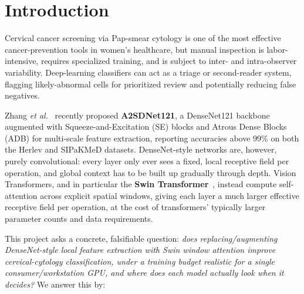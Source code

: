 \documentclass[10pt,twocolumn]{article}
\begin{document}
\section{Introduction}

Cervical cancer screening via Pap-smear cytology is one of the most effective cancer-prevention tools in women's healthcare, but manual inspection is labor-intensive, requires specialized training, and is subject to inter- and intra-observer variability. Deep-learning classifiers can act as a triage or second-reader system, flagging likely-abnormal cells for prioritized review and potentially reducing false negatives.

Zhang \emph{et al.}~\cite{zhang2025} recently proposed \textbf{A2SDNet121}, a DenseNet121 backbone augmented with Squeeze-and-Excitation (SE) blocks and Atrous Dense Blocks (ADB) for multi-scale feature extraction, reporting accuracies above 99\% on both the Herlev and SIPaKMeD datasets. DenseNet-style networks are, however, purely convolutional: every layer only ever sees a fixed, local receptive field per operation, and global context has to be built up gradually through depth. Vision Transformers, and in particular the \textbf{Swin Transformer}~\cite{liu2021swin}, instead compute self-attention across explicit spatial windows, giving each layer a much larger effective receptive field per operation, at the cost of transformers' typically larger parameter counts and data requirements.

This project asks a concrete, falsifiable question: \emph{does replacing/augmenting DenseNet-style local feature extraction with Swin window attention improve cervical-cytology classification, under a training budget realistic for a single consumer/workstation GPU, and where does each model actually look when it decides?} We answer this by:
\end{document}
